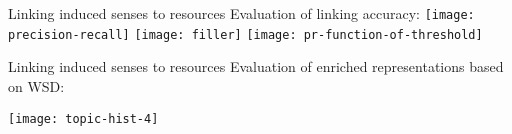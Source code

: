 \begin{frame}{ Linking induced senses to resources }
		\vspace{2em}
		Evaluation of linking accuracy:
		\centering
\texttt{[image: precision-recall]}
\texttt{[image: filler]}
\texttt{[image: pr-function-of-threshold]}

\end{frame}

\begin{frame}{ Linking induced senses to resources }
\centering
Evaluation of enriched representations based on WSD:

\texttt{[image: topic-hist-4]}

\end{frame}


